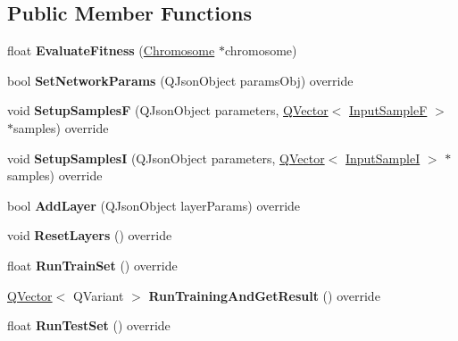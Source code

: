 \subsection*{Public Member Functions}
\begin{DoxyCompactItemize}
\item 
float {\bfseries Evaluate\+Fitness} (\hyperlink{class_chromosome}{Chromosome} $\ast$chromosome)\hypertarget{class_genetic_algorithm_adc2ff9ec8816b0979a3b3ac61e364518}{}\label{class_genetic_algorithm_adc2ff9ec8816b0979a3b3ac61e364518}

\item 
bool {\bfseries Set\+Network\+Params} (Q\+Json\+Object params\+Obj) override\hypertarget{class_genetic_algorithm_a8013ce6b1043de624b679c2d109ed80d}{}\label{class_genetic_algorithm_a8013ce6b1043de624b679c2d109ed80d}

\item 
void {\bfseries Setup\+SamplesF} (Q\+Json\+Object parameters, \hyperlink{class_q_vector}{Q\+Vector}$<$ \hyperlink{class_q_pair}{Input\+SampleF} $>$ $\ast$samples) override\hypertarget{class_genetic_algorithm_aa7e7cd7c3026f12e56f904106e90e8f0}{}\label{class_genetic_algorithm_aa7e7cd7c3026f12e56f904106e90e8f0}

\item 
void {\bfseries Setup\+SamplesI} (Q\+Json\+Object parameters, \hyperlink{class_q_vector}{Q\+Vector}$<$ \hyperlink{class_q_pair}{Input\+SampleI} $>$ $\ast$samples) override\hypertarget{class_genetic_algorithm_a5d75f5d038e6a59dc45ac778d04b1979}{}\label{class_genetic_algorithm_a5d75f5d038e6a59dc45ac778d04b1979}

\item 
bool {\bfseries Add\+Layer} (Q\+Json\+Object layer\+Params) override\hypertarget{class_genetic_algorithm_a164e48b38c6f9113bd436cce18a93b65}{}\label{class_genetic_algorithm_a164e48b38c6f9113bd436cce18a93b65}

\item 
void {\bfseries Reset\+Layers} () override\hypertarget{class_genetic_algorithm_af2ce8f9def4f4eddc7b8aa471705d8a6}{}\label{class_genetic_algorithm_af2ce8f9def4f4eddc7b8aa471705d8a6}

\item 
float {\bfseries Run\+Train\+Set} () override\hypertarget{class_genetic_algorithm_ad0cad1893056640d411928eb5184f199}{}\label{class_genetic_algorithm_ad0cad1893056640d411928eb5184f199}

\item 
\hyperlink{class_q_vector}{Q\+Vector}$<$ Q\+Variant $>$ {\bfseries Run\+Training\+And\+Get\+Result} () override\hypertarget{class_genetic_algorithm_ac6b7a46cf3b71a79b4ae2612a2802607}{}\label{class_genetic_algorithm_ac6b7a46cf3b71a79b4ae2612a2802607}

\item 
float {\bfseries Run\+Test\+Set} () override\hypertarget{class_genetic_algorithm_a6e56ca20f24e96e80007091f6a7d2acd}{}\label{class_genetic_algorithm_a6e56ca20f24e96e80007091f6a7d2acd}

\end{DoxyCompactItemize}
